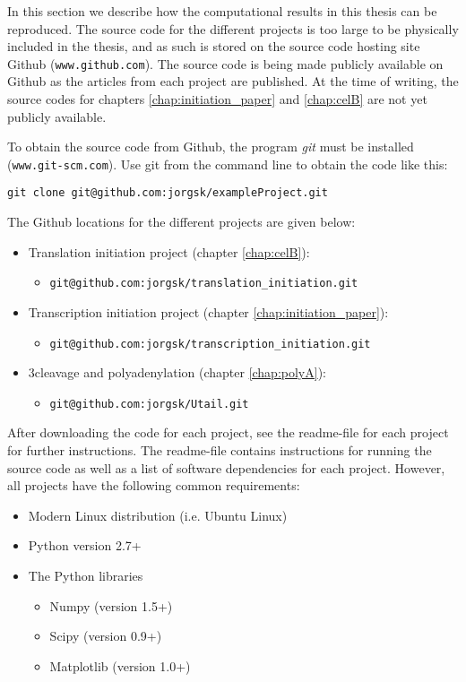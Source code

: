 %
In this section we describe how the computational results in this thesis
can be reproduced. The source code for the different projects is too
large to be physically included in the thesis, and as such is stored on
the source code hosting site Github (\nolinkurl{www.github.com}). The
source code is being made publicly available on Github as the articles
from each project are published. At the time of writing, the source
codes for chapters \ref{chap:initiation_paper} and \ref{chap:celB} are
not yet publicly available.

To obtain the source code from Github, the program \textit{git} must be
installed (\nolinkurl{www.git-scm.com}). Use git from the command line
to obtain the code like this:

\begin{verbatim}
git clone git@github.com:jorgsk/exampleProject.git
\end{verbatim}

\noindent
The Github locations for the different projects are given below:

\begin{itemize}
	\item Translation initiation project (chapter \ref{chap:celB}):
		\begin{itemize}
			\item[] \nolinkurl{git@github.com:jorgsk/translation_initiation.git}
		\end{itemize}
	\item Transcription initiation project (chapter \ref{chap:initiation_paper}):
		\begin{itemize}
			\item[] \nolinkurl{git@github.com:jorgsk/transcription_initiation.git}
		\end{itemize}
	\item 3\ppp cleavage and polyadenylation (chapter \ref{chap:polyA}):
		\begin{itemize}
			\item[] \nolinkurl{git@github.com:jorgsk/Utail.git}
		\end{itemize}
\end{itemize}

After downloading the code for each project, see the readme-file for each
project for further instructions. The readme-file contains instructions for
running the source code as well as a list of software dependencies for each
project. However, all projects have the following common requirements:
\begin{itemize}
	\item Modern Linux distribution (i.e. Ubuntu Linux)
	\item Python version 2.7+
	\item The Python libraries
		\begin{itemize}
			\item[] Numpy (version 1.5+)
			\item[] Scipy (version 0.9+)
			\item[] Matplotlib (version 1.0+)
		\end{itemize}
\end{itemize}
